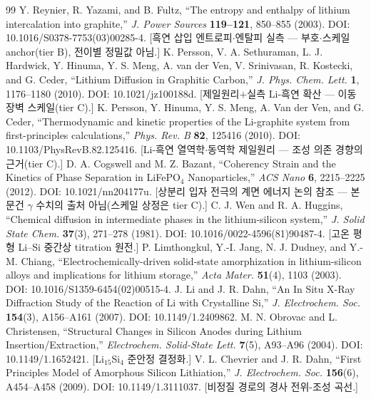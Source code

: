 \begin{thebibliography}{99}
 Y. Reynier, R. Yazami, and B. Fultz, ``The entropy and enthalpy of lithium intercalation into graphite,'' \emph{J. Power Sources} \textbf{119--121}, 850--855 (2003). DOI: 10.1016/S0378-7753(03)00285-4. [흑연 삽입 엔트로피$\cdot$엔탈피 실측 --- 부호$\cdot$스케일 anchor(tier B), 전이별 정밀값 아님.]
 K. Persson, V. A. Sethuraman, L. J. Hardwick, Y. Hinuma, Y. S. Meng, A. van der Ven, V. Srinivasan, R. Kostecki, and G. Ceder, ``Lithium Diffusion in Graphitic Carbon,'' \emph{J. Phys. Chem. Lett.} \textbf{1}, 1176--1180 (2010). DOI: 10.1021/jz100188d. [제일원리$+$실측 Li-흑연 확산 --- 이동 장벽 스케일(tier C).]
 K. Persson, Y. Hinuma, Y. S. Meng, A. Van der Ven, and G. Ceder, ``Thermodynamic and kinetic properties of the Li-graphite system from first-principles calculations,'' \emph{Phys. Rev. B} \textbf{82}, 125416 (2010). DOI: 10.1103/PhysRevB.82.125416. [Li-흑연 열역학$\cdot$동역학 제일원리 --- 조성 의존 경향의 근거(tier C).]
 D. A. Cogswell and M. Z. Bazant, ``Coherency Strain and the Kinetics of Phase Separation in LiFePO$_4$ Nanoparticles,'' \emph{ACS Nano} \textbf{6}, 2215--2225 (2012). DOI: 10.1021/nn204177u. [상분리 입자 전극의 계면 에너지 논의 참조 --- 본 문건 $\gamma$ 수치의 출처 아님(스케일 상정은 tier C).]
 C. J. Wen and R. A. Huggins, ``Chemical diffusion in intermediate phases in the lithium-silicon system,'' \emph{J. Solid State Chem.} \textbf{37}(3), 271--278 (1981). DOI: 10.1016/0022-4596(81)90487-4. [고온 평형 Li--Si 중간상 titration 원전.]
 P. Limthongkul, Y.-I. Jang, N. J. Dudney, and Y.-M. Chiang, ``Electrochemically-driven solid-state amorphization in lithium-silicon alloys and implications for lithium storage,'' \emph{Acta Mater.} \textbf{51}(4), 1103 (2003). DOI: 10.1016/S1359-6454(02)00515-4.
 J. Li and J. R. Dahn, ``An In Situ X-Ray Diffraction Study of the Reaction of Li with Crystalline Si,'' \emph{J. Electrochem. Soc.} \textbf{154}(3), A156--A161 (2007). DOI: 10.1149/1.2409862.
 M. N. Obrovac and L. Christensen, ``Structural Changes in Silicon Anodes during Lithium Insertion/Extraction,'' \emph{Electrochem. Solid-State Lett.} \textbf{7}(5), A93--A96 (2004). DOI: 10.1149/1.1652421. [Li$_{15}$Si$_4$ 준안정 결정화.]
 V. L. Chevrier and J. R. Dahn, ``First Principles Model of Amorphous Silicon Lithiation,'' \emph{J. Electrochem. Soc.} \textbf{156}(6), A454--A458 (2009). DOI: 10.1149/1.3111037. [비정질 경로의 경사 전위-조성 곡선.]

\end{thebibliography}
